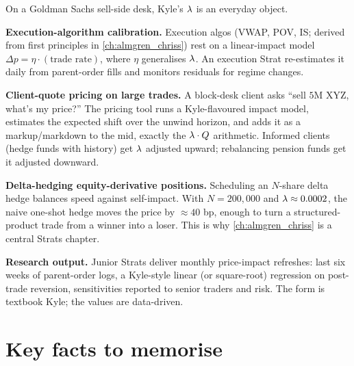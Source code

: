 \begin{gsbox}
On a Goldman Sachs sell-side desk, Kyle's $\lambda$ is an everyday
object.

\textbf{Execution-algorithm calibration.} Execution algos (VWAP,
POV, IS; derived from first principles in
\cref{ch:almgren_chriss}) rest on a linear-impact model $\Delta p
= \eta \cdot (\text{trade rate})$, where $\eta$ generalises
$\lambda$. An execution Strat re-estimates it daily from
parent-order fills and monitors residuals for regime changes.

\textbf{Client-quote pricing on large trades.} A block-desk
client asks ``sell $5$M XYZ, what's my price?'' The pricing tool
runs a Kyle-flavoured impact model, estimates the expected shift
over the unwind horizon, and adds it as a markup/markdown to the
mid, exactly the $\lambda \cdot Q$ arithmetic. Informed clients
(hedge funds with history) get $\lambda$ adjusted upward;
rebalancing pension funds get it adjusted downward.

\textbf{Delta-hedging equity-derivative positions.} Scheduling an
$N$-share delta hedge balances speed against self-impact. With
$N = 200{,}000$ and $\lambda \approx 0.0002$, the naive one-shot
hedge moves the price by $\approx 40$ bp, enough to turn a
structured-product trade from a winner into a loser. This is
why \cref{ch:almgren_chriss} is a central Strats chapter.

\textbf{Research output.} Junior Strats deliver monthly
price-impact refreshes: last six weeks of parent-order logs, a
Kyle-style linear (or square-root) regression on post-trade
reversion, sensitivities reported to senior traders and risk.
The form is textbook Kyle; the values are data-driven.
\end{gsbox}

\section{Key facts to memorise}
\label{sec:ch5_keyfacts}

